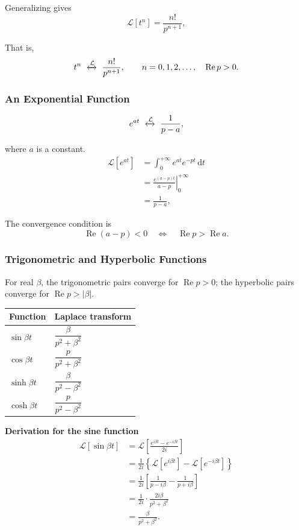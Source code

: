 \documentclass[11pt,a4paper]{article}
\theoremstyle{definition}
\theoremstyle{plain}
\begin{document}
Generalizing gives
\[
\mathcal L[t^n]=\frac{n!}{p^{n+1}},
\]

That is,
\[
t^n\ \xleftrightarrow{\mathcal L}\
\frac{n!}{p^{n+1}},
\qquad n=0,1,2,\ldots,\quad \operatorname{Re}p>0.
\]

\subsubsection*{An Exponential Function}
\[
e^{at}\ \xleftrightarrow{\mathcal L}\ \frac1{p-a},
\]

where \(a\) is a constant.
\[
\begin{aligned}
\mathcal L[e^{at}]
&=\int_0^{+\infty}e^{at}e^{-pt}\,\mathrm dt\\
&=\left.\frac{e^{(a-p)t}}{a-p}\right|_0^{+\infty}\\
&=\frac1{p-a},
\end{aligned}
\]

The convergence condition is
\[
\operatorname{Re}(a-p)<0
\quad\Longleftrightarrow\quad
\operatorname{Re}p>\operatorname{Re}a.
\]

\subsubsection*{Trigonometric and Hyperbolic Functions}

For real \(\beta\), the trigonometric pairs converge for \(\operatorname{Re}p>0\);
the hyperbolic pairs converge for \(\operatorname{Re}p>|\beta|\).

\begingroup
\small
\renewcommand{\arraystretch}{1.65}
\everymath{\displaystyle}
\begin{longtable}{@{}p{}p{}@{}}
\toprule
Function & Laplace transform \\
\midrule
\endhead
\bottomrule
\endlastfoot
\(\sin\beta t\) & \(\dfrac{\beta}{p^2+\beta^2}\) \\
\(\cos\beta t\) & \(\dfrac{p}{p^2+\beta^2}\) \\
\(\sinh\beta t\) & \(\dfrac{\beta}{p^2-\beta^2}\) \\
\(\cosh\beta t\) & \(\dfrac{p}{p^2-\beta^2}\) \\
\end{longtable}
\endgroup

\textbf{Derivation for the sine function}
\[
\begin{aligned}
\mathcal L[\sin\beta t]
&=\mathcal L\!\left[
\frac{e^{i\beta t}-e^{-i\beta t}}{2i}
\right]\\
&=\frac1{2i}\left\{
\mathcal L[e^{i\beta t}]
-\mathcal L[e^{-i\beta t}]
\right\}\\
&=\frac1{2i}\left[
\frac1{p-i\beta}-\frac1{p+i\beta}
\right]\\
&=\frac1{2i}\cdot\frac{2i\beta}{p^2+\beta^2}\\
&=\frac{\beta}{p^2+\beta^2}.
\end{aligned}
\]
\end{document}
